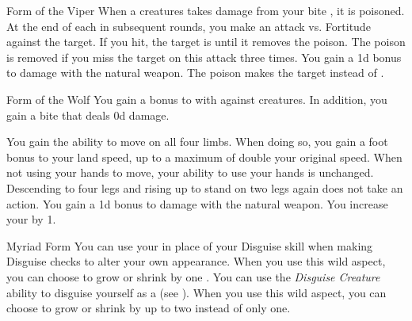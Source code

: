 {\begin{freeability}{Form of the Viper}
                \rankline
                 When a creatures takes damage from your bite , it is poisoned.
                At the end of each  in subsequent rounds, you make an attack vs. Fortitude against the target.
                If you hit, the target is  until it removes the poison.
                The poison is removed if you miss the target on this attack three times.
                 You gain a \plus1d bonus to damage with the natural weapon.
                 The poison makes the target  instead of .
            \end{freeability}

            \begin{freeability}{Form of the Wolf}
                You gain a  bonus to  with  against  creatures.
                In addition, you gain a bite  that deals \plus0d damage.

                \rankline
                 You gain the ability to move on all four limbs.
                When doing so, you gain a  foot bonus to your land speed, up to a maximum of double your original speed.
                When not using your hands to move, your ability to use your hands is unchanged.
                Descending to four legs and rising up to stand on two legs again does not take an action.
                 You gain a \plus1d bonus to damage with the natural weapon.
                 You increase your  by 1.
            \end{freeability}

            \begin{freeability}{Myriad Form}
                You can use your  in place of your Disguise skill when making Disguise checks to alter your own appearance.
                \rankline
                 When you use this wild aspect, you can choose to grow or shrink by one .
                 You can use the \textit{Disguise Creature} ability to disguise yourself as a  (see ).
                 When you use this wild aspect, you can choose to grow or shrink by up to two  instead of only one.
            \end{freeability}

}
